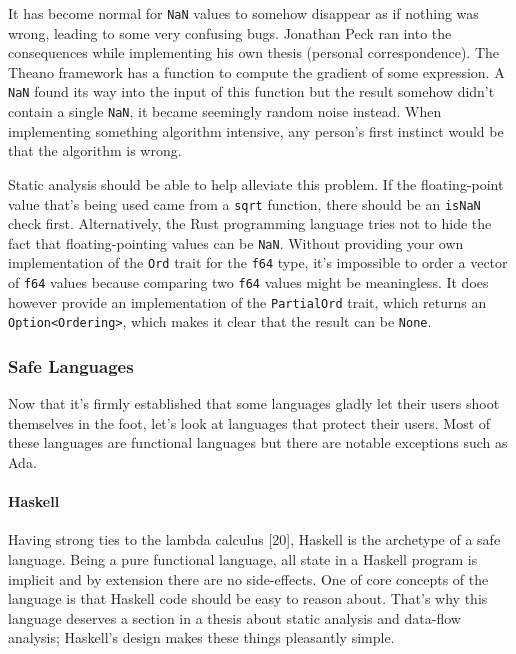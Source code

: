 \documentclass[]{article}
\let\oldparagraph\paragraph
\renewcommand{\paragraph}[1]{\oldparagraph{#1}\mbox{}}
\begin{document}
It has become normal for \texttt{NaN} values to somehow disappear as if
nothing was wrong, leading to some very confusing bugs. Jonathan Peck
ran into the consequences while implementing his own thesis (personal
correspondence). The Theano framework has a function to compute the
gradient of some expression. A \texttt{NaN} found its way into the input
of this function but the result somehow didn't contain a single
\texttt{NaN}, it became seemingly random noise instead. When
implementing something algorithm intensive, any person's first instinct
would be that the algorithm is wrong.

Static analysis should be able to help alleviate this problem. If the
floating-point value that's being used came from a \texttt{sqrt}
function, there should be an \texttt{isNaN} check first. Alternatively,
the Rust programming language tries not to hide the fact that
floating-pointing values can be \texttt{NaN}. Without providing your own
implementation of the \texttt{Ord} trait for the \texttt{f64} type, it's
impossible to order a vector of \texttt{f64} values because comparing
two \texttt{f64} values might be meaningless. It does however provide an
implementation of the \texttt{PartialOrd} trait, which returns an
\texttt{Option\textless{}Ordering\textgreater{}}, which makes it clear
that the result can be \texttt{None}.

\subsubsection{Safe Languages}\label{safe-languages}

Now that it's firmly established that some languages gladly let their
users shoot themselves in the foot, let's look at languages that protect
their users. Most of these languages are functional languages but there
are notable exceptions such as Ada.

\paragraph{Haskell}\label{haskell}

Having strong ties to the lambda calculus {[}20{]}, Haskell is the
archetype of a safe language. Being a pure functional language, all
state in a Haskell program is implicit and by extension there are no
side-effects. One of core concepts of the language is that Haskell code
should be easy to reason about. That's why this language deserves a
section in a thesis about static analysis and data-flow analysis;
Haskell's design makes these things pleasantly simple.
\end{document}
